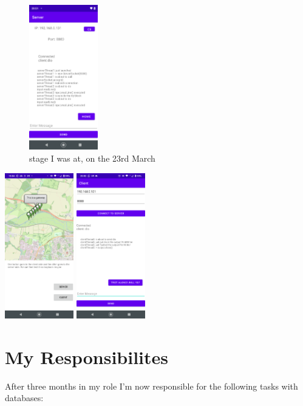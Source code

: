 \documentclass[a4paper,12pt]{article}
\begin{document}
\begin{figure}
\centering
\includegraphics[width=3cm]{./server_g7.PNG}
\caption{stage I was at, on the 23rd March}\label{wrap-fig:3}
\end{figure}


\includegraphics[width=3cm]{./current_status_g8.PNG}
\includegraphics[width=3cm]{./client_g8.PNG}

\section{My Responsibilites}

After three months in my role I'm now responsible for the following tasks with databases:
\end{document}
